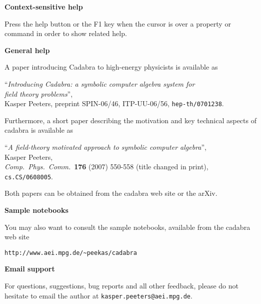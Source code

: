 \bigskip

{\bfseries Context-sensitive help}

Press the help button or the F1 key when the cursor is over a property
or command in order to show related help.

{\bfseries General help}

A paper introducing Cadabra to high-energy physicists is
available as
\begin{center}
\begin{minipage}{.95\textwidth}
``\emph{Introducing Cadabra: a symbolic computer algebra system for\\
	 field theory problems}'',\\
Kasper Peeters,
preprint SPIN-06/46, ITP-UU-06/56, {\tt hep-th/0701238}.
\end{minipage}
\end{center}
\medskip

Furthermore, a short paper describing the motivation and key technical
aspects of cadabra is available as
\begin{center}
\begin{minipage}{.95\textwidth}
``\emph{A field-theory motivated approach to symbolic computer algebra}'',\\
Kasper Peeters,\\
\emph{Comp.~Phys.~Comm.}~{\bf 176} (2007) 550-558 (title changed in print),\\
{\tt cs.CS/0608005}.\\
\end{minipage}
\end{center}
Both papers can be obtained from the cadabra web site or the arXiv. 
\bigskip

{\bfseries Sample notebooks}

You may also want to consult the sample notebooks, available from the
cadabra web site
\begin{center}
\verb|http://www.aei.mpg.de/~peekas/cadabra|
\end{center}
\bigskip

{\bfseries Email support}

For questions, suggestions, bug reports and all other feedback, please
do not hesitate to email the author at \verb|kasper.peeters@aei.mpg.de|.
